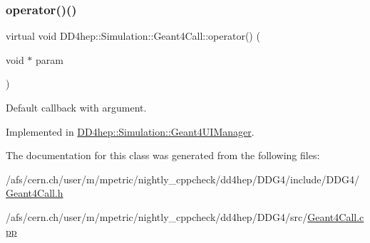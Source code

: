 \subsubsection{\texorpdfstring{operator()()}{operator()()}}
{\footnotesize\ttfamily virtual void D\+D4hep\+::\+Simulation\+::\+Geant4\+Call\+::operator() (\begin{DoxyParamCaption}\item[{void $\ast$}]{param }\end{DoxyParamCaption})\hspace{0.3cm}{\ttfamily [pure virtual]}}



Default callback with argument. 



Implemented in \hyperlink{class_d_d4hep_1_1_simulation_1_1_geant4_u_i_manager_a3b883391f9b66b1620c0ba44406b3247}{D\+D4hep\+::\+Simulation\+::\+Geant4\+U\+I\+Manager}.



The documentation for this class was generated from the following files\+:\begin{DoxyCompactItemize}
\item 
/afs/cern.\+ch/user/m/mpetric/nightly\+\_\+cppcheck/dd4hep/\+D\+D\+G4/include/\+D\+D\+G4/\hyperlink{_geant4_call_8h}{Geant4\+Call.\+h}\item 
/afs/cern.\+ch/user/m/mpetric/nightly\+\_\+cppcheck/dd4hep/\+D\+D\+G4/src/\hyperlink{_geant4_call_8cpp}{Geant4\+Call.\+cpp}\end{DoxyCompactItemize}
